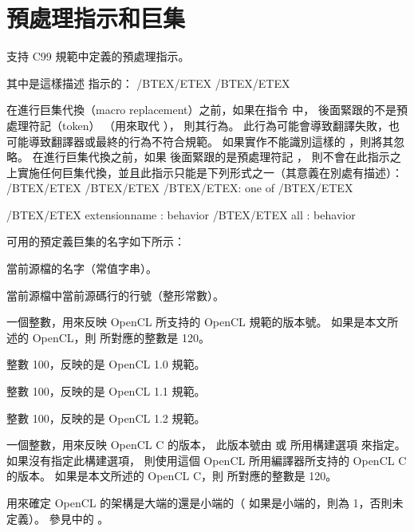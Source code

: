 \section{預處理指示和巨集}

支持 C99 規範中定義的預處理指示。

其中是這樣描述  指示的：
\startclc
/BTEX/ETEX /BTEX{}/ETEX
\stopclc

在進行巨集代換（macro replacement）之前，如果在指令  中，
  後面緊跟的不是預處理符記（token） {}
（用來取代 {}），
則其行為。
此行為可能會導致翻譯失敗，也可能導致翻譯器或最終的行為不符合規範。
如果實作不能識別這樣的 ，則將其忽略。
在進行巨集代換之前，如果  後面緊跟的是預處理符記 {}，
則不會在此指示之上實施任何巨集代換，並且此指示只能是下列形式之一（其意義在別處有描述）：
\startclc
/BTEX/ETEX /BTEX/ETEX
	/BTEX/ETEX: one of /BTEX/ETEX

/BTEX/ETEX extensionname : behavior
/BTEX/ETEX all : behavior
\stopclc

可用的預定義巨集的名字如下所示：

當前源檔的名字（常值字串）。

當前源檔中當前源碼行的行號（整形常數）。

一個整數，用來反映 OpenCL  所支持的 OpenCL 規範的版本號。
如果是本文所述的 OpenCL，則  所對應的整數是 120。

整數 100，反映的是 OpenCL 1.0 規範。

整數 100，反映的是 OpenCL 1.1 規範。

整數 100，反映的是 OpenCL 1.2 規範。

一個整數，用來反映 OpenCL C 的版本，
此版本號由  或 
 所用構建選項  來指定。
如果沒有指定此構建選項，
則使用這個 OpenCL  所用編譯器所支持的 OpenCL C 的版本。
如果是本文所述的 OpenCL C，則  所對應的整數是 120。

用來確定 OpenCL  的架構是大端的還是小端的（
如果是小端的，則為 1，否則未定義）。
參見中的 。

